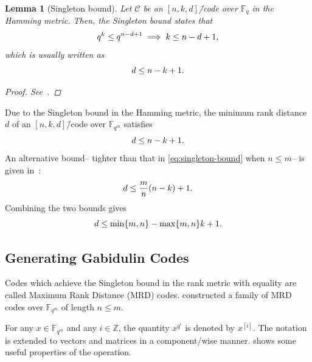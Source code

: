 \documentclass[version=last, paper=A4, parskip=half, oneside]{scrbook}
\theoremstyle{plain}
\newtheorem{lemma}{Lemma}
\theoremstyle{definition}
\theoremstyle{remark}
\newcommand*{\FF}{\ensuremath{\mathbb{F}}}
\newcommand*{\ZZ}{\ensuremath{\mathbb{Z}}}
\begin{document}
\begin{lemma}[Singleton bound]
  Let \(\mathcal{C}\) be an \([n, k, d]\)\=/code over \(\FF_q\) in the Hamming
  metric.  Then, the \emph{Singleton bound} states that
  \[
    q^k \le q^{n - d + 1} \implies k \le n - d + 1\text,
  \]
  which is usually written as
  \[
    d \le n - k + 1\text.
  \]
  \begin{proof}
    See~\cite{Sin64}.
  \end{proof}
\end{lemma}

Due to the Singleton bound in the Hamming metric, the minimum rank distance
\(d\) of an \([n, k, d]\)\=/code over \(\FF_{q^m}\) satisfies
\begin{equation}\label{eq:singleton-bound}
  d \le n - k + 1\text.
\end{equation}
An alternative bound\--- tighter than that in \cref{eq:singleton-bound} when
\(n \le m\)\--- is given in~\cite{Gab85}:
\[
  d \le \frac{m}{n}(n - k) + 1\text.
\]
Combining the two bounds gives
\[
  d \le \min\{m, n\} - \max\{m, n\} k + 1\text.
\]

\subsection{Generating Gabidulin Codes}

Codes which achieve the Singleton bound in the rank metric with equality are
called Maximum Rank Distance (MRD) codes.  \Textcite{Gab85} constructed a family
of MRD codes over \(\FF_{q^m}\) of length \(n \le m\).

For any \(x \in \FF_{q^m}\) and any \(i \in \ZZ\), the quantity \(x^{q^i}\) is
denoted by \(x^{[i]}\).  The notation is extended to vectors and matrices in a
component\-/wise manner.   shows
some useful properties of the operation.
\end{document}
